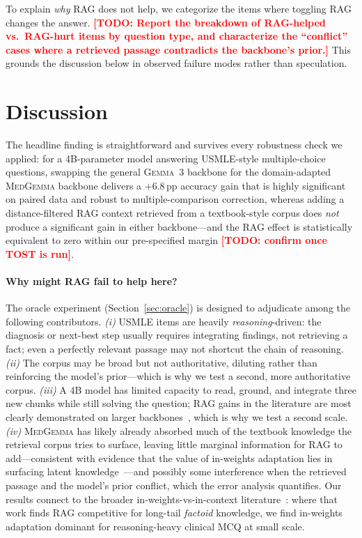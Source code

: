 \documentclass[11pt,a4paper]{article}
\newcommand{\TODO}[1]{\textcolor{red}{\textbf{[TODO: #1]}}}
\begin{document}
To explain \emph{why} RAG does not help, we categorize the items where toggling
RAG changes the answer. \TODO{Report the breakdown of RAG-helped vs.\ RAG-hurt
items by question type, and characterize the ``conflict'' cases where a retrieved
passage contradicts the backbone's prior.} This grounds the discussion below in
observed failure modes rather than speculation.

\section{Discussion}

The headline finding is straightforward and survives every robustness check we
applied: for a 4B-parameter model answering USMLE-style multiple-choice
questions, swapping the general \textsc{Gemma~3} backbone for the domain-adapted
\textsc{MedGemma} backbone delivers a $+6.8$\,pp accuracy gain that is highly
significant on paired data and robust to multiple-comparison correction, whereas
adding a distance-filtered RAG context retrieved from a textbook-style corpus
does \emph{not} produce a significant gain in either backbone---and the RAG
effect is statistically equivalent to zero within our pre-specified margin
\TODO{confirm once TOST is run}.

\paragraph{Why might RAG fail to help here?}
The oracle experiment (Section~\ref{sec:oracle}) is designed to adjudicate among
the following contributors. \emph{(i)} USMLE items are heavily
\emph{reasoning}-driven: the diagnosis or next-best step usually requires
integrating findings, not retrieving a fact; even a perfectly relevant passage
may not shortcut the chain of reasoning. \emph{(ii)} The corpus may be broad but
not authoritative, diluting rather than reinforcing the model's prior---which is
why we test a second, more authoritative corpus. \emph{(iii)} A 4B model has
limited capacity to read, ground, and integrate three new chunks while still
solving the question; RAG gains in the literature are most clearly demonstrated
on larger backbones~\cite{xiong2024benchmarkingrag,ovadia2024finetuningvsrag},
which is why we test a second scale. \emph{(iv)} \textsc{MedGemma} has likely
already absorbed much of the textbook knowledge the retrieval corpus tries to
surface, leaving little marginal information for RAG to add---consistent with
evidence that the value of in-weights adaptation lies in surfacing latent
knowledge~\cite{gekhman2024hallucinations}---and possibly some interference when
the retrieved passage and the model's prior conflict, which the error analysis
quantifies. Our results connect to the broader in-weights-vs-in-context
literature~\cite{ovadia2024finetuningvsrag,soudani2024finetuningvsrag}: where that
work finds RAG competitive for long-tail \emph{factoid} knowledge, we find
in-weights adaptation dominant for reasoning-heavy clinical MCQ at small scale.
\end{document}
